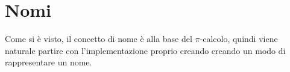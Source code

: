 \section{Nomi}

Come si \`e visto, il concetto di nome \`e alla base del $\pi$-calcolo,
quindi viene naturale partire con l'implementazione proprio creando creando
un modo di rappresentare un nome.




